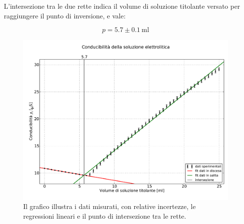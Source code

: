 L'intersezione tra le due rette indica il volume di soluzione titolante versato per raggiungere
il punto di inversione, e vale:

\begin{equation*}
    p = 5.7 \pm 0.1 ~ \si{\milli\litre}
\end{equation*}

\begin{figure}
    \includegraphics[scale=0.5]{Rette_von_Fitt.pdf}
    \caption{Il grafico illustra i dati  misurati, con relative incertezze, le regressioni lineari
        e il punto di intersezione tra le rette.}
    \label{fig:meas}
\end{figure}
